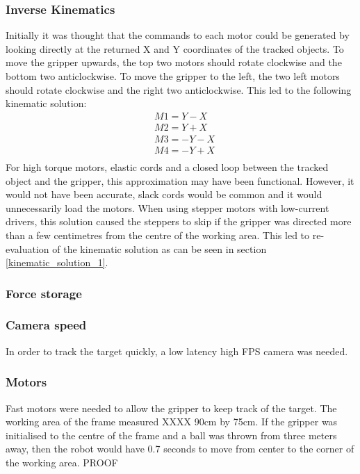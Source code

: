 \documentclass[conference]{IEEEtran}
\begin{document}
	\subsubsection{Inverse Kinematics}\label{initial_kinematics}
	Initially it was thought that the commands to each motor could be generated by looking directly at the returned X and Y coordinates of the tracked objects. To move the gripper upwards, the top two motors should rotate clockwise and the bottom two anticlockwise. To move the gripper to the left, the two left motors should rotate clockwise and the right two anticlockwise. This led to the following kinematic solution:
	\begin{equation}
	\begin{aligned}
	&M1 = Y - X \\
	&M2 = Y + X\\
	&M3 = -Y -X\\
	&M4 = -Y + X\\
	\end{aligned}
	\end{equation}
	For high torque motors, elastic cords and a closed loop between the tracked object and the gripper, this approximation may have been functional. However, it would not have been accurate, slack cords would be common and it would unnecessarily load the motors. When using stepper motors with low-current drivers, this solution caused the steppers to skip if the gripper was directed more than a few centimetres from the centre of the working area. 
	This led to re-evaluation of the kinematic solution as can be seen in section \ref{kinematic_solution_1}.
	
	\subsubsection{Force storage} \label{force_problem}
	
	
	\subsubsection{Camera speed}
	In order to track the target quickly, a low latency high FPS camera was needed.
	\subsubsection{Motors}
	Fast motors were needed to allow the gripper to keep track of the target. The working area of the frame measured XXXX 90cm by 75cm. If the gripper was initialised to the centre of the frame and a ball was thrown from three meters away, then the robot would have 0.7 seconds to move from center to the corner of the working area. PROOF
\end{document}
